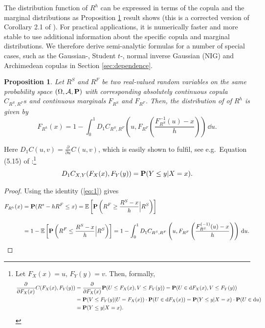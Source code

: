 \documentclass[square]{article} %
\theoremstyle{plain}
\newtheorem{proposition}[theorem]{Proposition}
\theoremstyle{definition} %
\begin{document}
The distribution function of $R^h$ can be expressed in terms of the
copula and the marginal distributions as Proposition \ref{prop:dfrh}
result shows (this is a corrected version of Corollary 2.1 of
\citep{Barbi2014}). For practical applications, it is numerically
faster and more stable to use additional information about the
specific copula and marginal distributions. We therefore derive
semi-analytic formulas for a number of special cases, such as the
Gaussian-, Student $t$-, normal inverse Gaussian (NIG) and Archimedean
copulas in Section \ref{sec:dependence}.

\begin{proposition}
  \label{prop:dfrh}
  Let $R^S$ and $R^F$ be two real-valued random variables on the same
  probability space $(\Omega, \mathcal A, {\bf P})$ with corresponding
  absolutely continuous copula $C_{R^S, R^F}s$ and
  continuous marginals $F_{R^S}$ and $F_{R^F}$. Then, the distribution
  of of $R^h$ is given by
  \begin{equation}
    \label{eq:3}
    F_{R^h}(x) = 1- \int^1_0 D_1 C_{R^S, R^F}
    \left( u, F_{R^F} \left( \frac{F^{-1}_{R^S}(u)-x}{h} \right)
    \right)\, \dd u.
  \end{equation}
\end{proposition}\medskip
Here $D_1 C(u,v)=\displaystyle \frac{\partial}{\partial u} C(u,v)$,
which is easily shown to fulfil, see e.g.\ Equation (5.15) of
\citep{McNeil2005}:\footnote{%
  Let $F_X(x)=u$, $F_Y(y)=v$. Then, formally,
  \begin{align*}
    \frac{\partial}{\partial F_X(x)} C(F_X(x), F_Y(y)) %
    &= \frac{\partial}{\partial F_X(x)} \p(U\leq F_X(x),
      V\leq F_Y(y)) %
      = \p(U\in \dd F_X(x), V\leq F_Y(y))\\ %
    &= \p(V\leq F_Y(y)| U = F_X(x))\cdot \p(U \in \dd
      F_X(x)) %
      = \p(Y\leq y|X=x)\cdot \p(U\in \dd u)\\ %
    &= \p(Y\leq y|X=x).
  \end{align*}}
\begin{equation}
  \label{eq:1}
  D_1 C_{X,Y}(F_X(x), F_Y(y)) = {\bf P}(Y\leq y|X=x).
\end{equation}
\begin{proof}
  Using the identity (\ref{eq:1}) gives
  \begin{align*}
    F_{R^h}(x) &= \p(R^s - h R^F\leq x) %
                 = \E\left[\p\left(R^F\geq \frac{R^S-x}{h}\Big|
                 R^S\right)\right]\\[10pt]
               &= 1-\E\left[\p\left(R^F\leq \frac{R^S-x}{h}\Big|
                 R^S\right)\right]%
               = 1- \int_0^1 D_1 C_{R^S, R^F}\left(u,
                 F_{R^F}\left(\frac{F^{(-1)}_{R^S}(u) -
                 x}{h}\right)\right)\, \dd u.
  \end{align*}
\end{proof}\medskip
\end{document}

